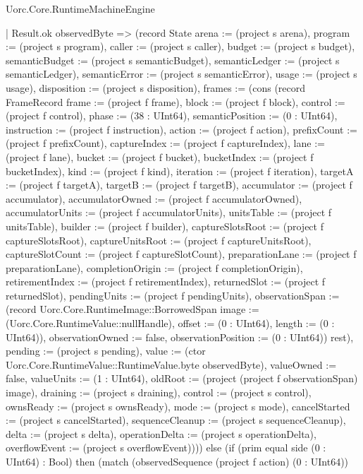 \begin{lexlean}{Uorc.Core.RuntimeMachineEngine}
\begin{semanticmodule}
{        | Result.ok observedByte => (record State {arena := (project s arena), program := (project s program), caller := (project s caller), budget := (project s budget), semanticBudget := (project s semanticBudget), semanticLedger := (project s semanticLedger), semanticError := (project s semanticError), usage := (project s usage), disposition := (project s disposition), frames := (cons (record FrameRecord {frame := (project f frame), block := (project f block), control := (project f control), phase := (38 : UInt64), semanticPosition := (0 : UInt64), instruction := (project f instruction), action := (project f action), prefixCount := (project f prefixCount), captureIndex := (project f captureIndex), lane := (project f lane), bucket := (project f bucket), bucketIndex := (project f bucketIndex), kind := (project f kind), iteration := (project f iteration), targetA := (project f targetA), targetB := (project f targetB), accumulator := (project f accumulator), accumulatorOwned := (project f accumulatorOwned), accumulatorUnits := (project f accumulatorUnits), unitsTable := (project f unitsTable), builder := (project f builder), captureSlotsRoot := (project f captureSlotsRoot), captureUnitsRoot := (project f captureUnitsRoot), captureSlotCount := (project f captureSlotCount), preparationLane := (project f preparationLane), completionOrigin := (project f completionOrigin), retirementIndex := (project f retirementIndex), returnedSlot := (project f returnedSlot), pendingUnits := (project f pendingUnits), observationSpan := (record Uorc.Core.RuntimeImage::BorrowedSpan {image := (Uorc.Core.RuntimeValue::nullHandle), offset := (0 : UInt64), length := (0 : UInt64)}), observationOwned := false, observationPosition := (0 : UInt64)}) rest), pending := (project s pending), value := (ctor Uorc.Core.RuntimeValue::RuntimeValue.byte observedByte), valueOwned := false, valueUnits := (1 : UInt64), oldRoot := (project (project f observationSpan) image), draining := (project s draining), control := (project s control), ownsReady := (project s ownsReady), mode := (project s mode), cancelStarted := (project s cancelStarted), sequenceCleanup := (project s sequenceCleanup), delta := (project s delta), operationDelta := (project s operationDelta), overflowEvent := (project s overflowEvent)}))) else (if (prim equal side (0 : UInt64) : Bool) then (match (observedSequence (project f action) (0 : UInt64))
}
\end{semanticmodule}
\end{lexlean}
